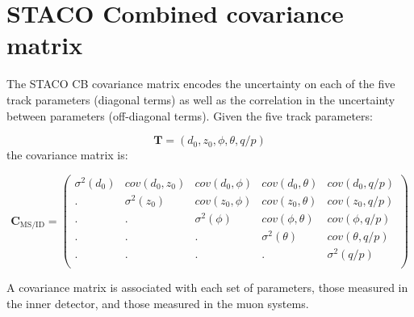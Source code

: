\newcommand{\diag}[1]{\ensuremath{\sigma^{2}(#1)}}
\newcommand{\offdiag}[2]{\ensuremath{cov(#1, #2)}}
\chapter{STACO Combined covariance matrix} \label{app:DetectorCov}

The STACO CB covariance matrix encodes the uncertainty on each of the five track parameters (diagonal terms) as well as the correlation in the uncertainty between parameters (off-diagonal terms). Given the five track parameters:

\begin{equation}
  \mathbf{T} = (d_0,z_0,\phi,\theta,q/p)
\end{equation}
%
the covariance matrix is:

\begin{equation}
  \mathbf{C}_{\textrm{MS/ID}}=
  \begin{pmatrix}
    \diag{d_{0}} & \offdiag{d_{0}}{z_0} & \offdiag{d_{0}}{\phi} & \offdiag{d_{0}}{\theta} & \offdiag{d_{0}}{q/p}  \\
    .            & \diag{z_{0}}         & \offdiag{z_{0}}{\phi} & \offdiag{z_{0}}{\theta} & \offdiag{z_{0}}{q/p}  \\
    .            & .                    & \diag{\phi}           & \offdiag{\phi}{\theta}  & \offdiag{\phi}{q/p}   \\
    .            & .                    & .                     & \diag{\theta}           & \offdiag{\theta}{q/p} \\
    .            & .                    & .                     & .                       & \diag{q/p}            \\
  \end{pmatrix}
\end{equation}

A covariance matrix is associated with each set of parameters, those measured in the inner detector, and those measured in the muon systems.
